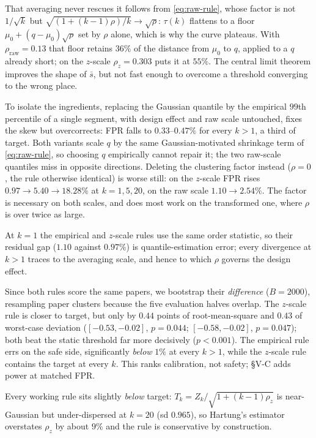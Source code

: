 \documentclass[10pt,conference,a4paper]{IEEEtran}
\newcommand{\sect}[1]{\S#1}
\begin{document}
That averaging never rescues it follows from \eqref{eq:raw-rule}, whose factor is not
$1/\sqrt{k}$ but $\sqrt{(1+(k-1)\rho)/k}\to\sqrt{\rho}$: $\tau(k)$ flattens to a floor
$\mu_0+(q-\mu_0)\sqrt{\rho}$ set by $\rho$ alone, which is why the curve plateaus. With
$\rho_{\text{raw}}=0.13$ that floor retains $36\%$ of the distance from $\mu_0$ to $q$,
applied to a $q$ already short; on the $z$-scale $\rho_z=0.303$ puts it at $55\%$. The
central limit theorem improves the shape of $\bar{s}$, but not fast enough to overcome a
threshold converging to the wrong place.

To isolate the ingredients, replacing the Gaussian quantile by the empirical $99$th
percentile of a single segment, with design effect and raw scale untouched, fixes the
skew but overcorrects: FPR falls to $0.33$--$0.47\%$ for every $k>1$, a third of target.
Both variants scale $q$ by the same Gaussian-motivated shrinkage term of
\eqref{eq:raw-rule}, so choosing $q$ empirically cannot repair it; the two raw-scale
quantiles miss in opposite directions. Deleting the clustering factor instead ($\rho=0$,
the rule otherwise identical) is worse still: on the $z$-scale FPR rises
$0.97\rightarrow5.40\rightarrow18.28\%$ at $k=1,5,20$, on the raw scale
$1.10\rightarrow2.54\%$. The factor is necessary on both scales, and does most work on
the transformed one, where $\rho$ is over twice as large.

At $k{=}1$ the empirical and $z$-scale rules use the same order statistic, so their
residual gap ($1.10$ against $0.97\%$) is quantile-estimation error; every divergence at
$k>1$ traces to the averaging scale, and hence to which $\rho$ governs the design effect.

Since both rules score the same papers, we bootstrap their \emph{difference}
($B{=}2000$), resampling paper clusters because the five evaluation halves overlap. The
$z$-scale rule is closer to target, but only by $0.44$ points of root-mean-square and
$0.43$ of worst-case deviation ($[-0.53,-0.02]$, $p=0.044$; $[-0.58,-0.02]$,
$p=0.047$); both beat the static threshold far more decisively ($p<0.001$). The
empirical rule errs on the safe side, significantly \emph{below} $1\%$ at every $k>1$,
while the $z$-scale rule contains the target at every $k$. This ranks calibration, not
safety; \sect{V-C} adds power at matched FPR.

Every working rule sits slightly \emph{below} target: $T_k=Z_k/\sqrt{1+(k-1)\rho_z}$ is
near-Gaussian but under-dispersed at $k{=}20$ (sd $0.965$), so Hartung's estimator
overstates $\rho_z$ by about $9\%$ and the rule is conservative by construction.
\end{document}
